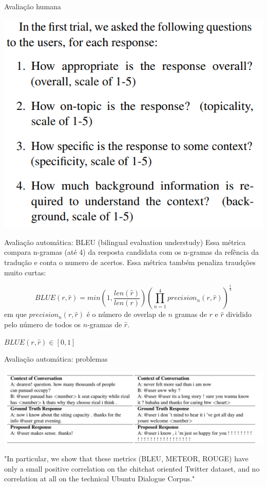 \documentclass[10pt]{beamer}
\begin{document}
\begin{frame}{Avaliação humana \cite{Lowe:2016}}
\begin{center}
\includegraphics[scale=0.4]{images/exemploEval1.png}
\end{center}
\end{frame}




\begin{frame}{Avaliação automática: BLEU (bilingual evaluation understudy) \cite{Papineni2001}}
Essa métrica compara n-gramas (até 4) da resposta candidata com os n-gramas da refência da tradução e conta o numero de acertos. Essa métrica também penaliza traudções muito curtas:

\begin{equation}
BLUE(r, \hat{r}) = min \left(1, \frac{len(\hat{r})}{len(r)} \right) \left(\prod_{n=1}^{4} precision_{n}(r, \hat{r}) \right)^{\frac{1}{4}}
\end{equation}
em que $ precision_{n}(r, \hat{r})$ é o número de overlap de $n$ gramas de $r$ e $\hat{r}$ dividido pelo número de todos os $n$-gramas de $\hat{r}$. 

$BLUE(r, \hat{r}) \in [0,1]$

\end{frame}


\begin{frame}{Avaliação automática: problemas}
\begin{center}
\includegraphics[scale=0.23]{images/weak_corr.png}
\end{center}

"In particular, we show that these metrics (BLEU, METEOR, ROUGE) have only a small positive correlation on the chitchat oriented Twitter dataset, and no correlation at all on the technical Ubuntu Dialogue Corpus." \cite{LiuLSNCP16}

\end{frame}
\end{document}
